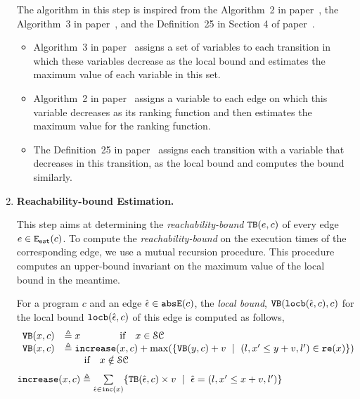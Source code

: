 \begin{enumerate}
 The algorithm in this step is inspired from the Algorithm~2 in paper~\cite{SinnZV14},
 the Algorithm~3 in paper~\cite{ZulegerGSV11},
 and the Definition~25 in Section 4 of paper~\cite{SinnZV17}.
 \begin{itemize}
 \item Algorithm~3 in paper~\cite{ZulegerGSV11} assigns a set of variables to each transition in which these variables decrease as the local bound
 and estimates the maximum value of each variable in this set.
 \item Algorithm~2 in paper~\cite{SinnZV14} assigns a variable to each edge on which this variable decreases as its ranking function
 and then estimates the maximum value for the ranking function.
 \item The Definition~25 in paper~\cite{SinnZV17}
 assigns each transition with a variable that decreases in this transition, as the local bound and computes the bound similarly.
 \end{itemize}


 \item \textbf{Reachability-bound Estimation.}
 
This step aims at determining the \emph{reachability-bound} ${\mathtt{TB}}(e, c)$ of every edge $e\in \mathtt{{E_{est}}}(c)$.
To compute the \emph{reachability-bound} on the execution
times of the corresponding edge, we use a mutual recursion procedure.
This procedure computes an upper-bound invariant on the maximum value of the local bound in the meantime.

\begin{defn}
 \label{def:ranking_bound}
For a program $c$ and an edge $\hat{\mathtt{\epsilon}{}} \in \mathtt{abs}{\mathtt{E}}(c)$,
the \emph{local bound}, ${\mathtt{VB}}(\mathtt{locb}(\hat{\mathtt{\epsilon}{}}, c), c)$ for the local bound $\mathtt{locb}(\hat{\mathtt{\epsilon}{}}, c)$
of this edge
is computed as follows,
 \[ 
\begin{array}{lll}
 {\ensuremath{\mathtt{VB}}}(x, c) & \triangleq x \qquad \qquad \text{if} \quad x \in \mathcal{SC} \\
 {\mathtt{VB}}(x, c) & \triangleq \mathtt{increase}(x, c) + 
 \max(\{{\mathtt{VB}}(y, c) + v ~\mid~ (l, x' \leq y + v, l') \in \mathtt{re}(x)\}) \\
 & \qquad \text{if} \quad x \notin \mathcal{SC}
\end{array}
\]
%
$\mathtt{increase}(x, c) \triangleq \sum\limits_{\hat{\mathtt{\epsilon}{}} \in \mathtt{inc}(x)}\{{\mathtt{TB}}(\hat{\mathtt{\epsilon}{}}, c) \times v ~\mid~ 
\hat{\mathtt{\epsilon}{}} = (l, x' \leq x + v, l')\}$
\end{defn}


\end{enumerate}
